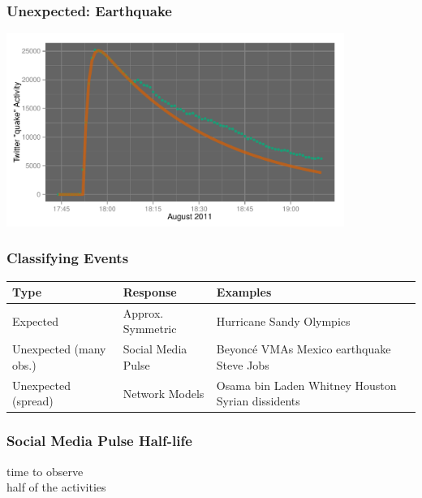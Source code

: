 \documentclass{beamer}
\begin{document}
\begin{frame}\frametitle{Unexpected: Earthquake}
  \begin{center}
    \includegraphics[width=11cm]{./imgs/va_quake_fit1.pdf}
  \end{center}
\end{frame}


\begin{frame}\frametitle{Classifying Events}
\begin{table}
\begin{tabular}{ m{2cm} | m{ 2.5cm} | m{4cm}}
\hline
Type & Response & Examples \\ \hline
Expected    & Approx. \newline Symmetric & Hurricane Sandy \newline Olympics \\ \hline
Unexpected (many obs.) & Social Media \newline Pulse & Beyonc\'{e} VMAs \newline  Mexico earthquake \newline  Steve Jobs \\ \hline
Unexpected (spread) & Network \newline Models & Osama bin Laden \newline  Whitney Houston \newline  Syrian dissidents \\ \hline
\end{tabular}
\end{table}
\end{frame}


\begin{frame}\frametitle{Social Media Pulse Half-life}
\begin{center}
{\Huge time to observe \\[10pt] half of the activities}
\end{center}
\end{frame}
\end{document}
